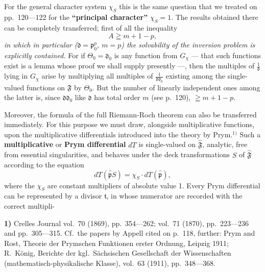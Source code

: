 \documentclass{article}
\begin{document}
For the general character system $\chi_S$ this is the same question that we treated on pp.~120---122 for the \textbf{``principal character''} $\chi_S = 1$. The results obtained there can be completely transferred; first of all the inequality
\[ A \geqq m + 1 - p, \]
\emph{in which in particular ($\mathfrak{d} = \mathfrak{p}_0^p$, $m = p$) the solvability of the inversion problem is explicitly contained.} For if $\Theta_0 = \mathfrak{d}_0$ is any function from $G_\chi$ --- that such functions exist is a lemma whose proof we shall supply presently ---, then the multiples of $\frac{1}{\mathfrak{d}}$ lying in $G_\chi$ arise by multiplying all multiples of $\frac{1}{\mathfrak{d}\mathfrak{d}_0}$ existing among the single-valued functions on $\mathfrak{F}$ by $\Theta_0$. But the number of linearly independent ones among the latter is, since $\mathfrak{d}\mathfrak{d}_0$ like $\mathfrak{d}$ has total order $m$ (see p.~120), $\geqq m + 1 - p$.

Moreover, the formula of the full Riemann-Roch theorem can also be transferred immediately. For this purpose we must draw, alongside multiplicative functions, upon the multiplicative differentials introduced into the theory by Prym.${}^{1)}$ Such a \textbf{multiplicative} or \textbf{Prym differential} $dT$ is single-valued on $\hat{\mathfrak{F}}$, analytic, free from essential singularities, and behaves under the deck transformations $S$ of $\hat{\mathfrak{F}}$ according to the equation
\[ dT(\hat{\mathfrak{p}}S) = \chi_S \cdot dT(\hat{\mathfrak{p}}), \]
where the $\chi_S$ are constant multipliers of absolute value 1. Every Prym differential can be represented by a divisor $\mathfrak{t}$, in whose numerator are recorded with the correct multipli-

\textbf{1)} Crelles Journal vol.~70 (1869), pp.~354---262; vol.~71 (1870), pp.~223---236 and pp.~305---315. Cf.\ the papers by Appell cited on p.~118, further: Prym and Rost, Theorie der Prymschen Funktionen erster Ordnung, Leipzig 1911; R.~König, Berichte der kgl.\ Sächsischen Gesellschaft der Wissenschaften (mathematisch-physikalische Klasse), vol.~63 (1911), pp.~348---368.
\end{document}
